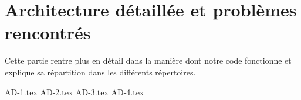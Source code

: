 \section{Architecture détaillée et problèmes rencontrés}
Cette partie rentre plus en détail dans la manière dont notre code fonctionne et explique sa répartition dans les différents répertoires.

{AD-1.tex}
{AD-2.tex}
{AD-3.tex}
{AD-4.tex}